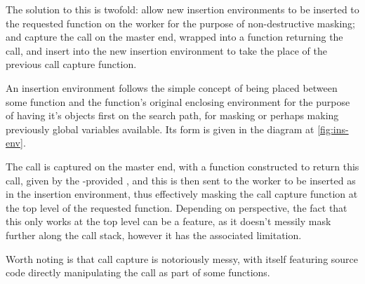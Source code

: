 The solution to this is twofold: allow new insertion environments to be inserted to the requested function on the worker for the purpose of non-destructive masking; and capture the call on the master end, wrapped into a function returning the call, and insert into the new insertion environment to take the place of the previous call capture function.

An insertion environment follows the simple concept of being placed between some function and the function's original enclosing environment for the purpose of having it's objects first on the search path, for masking or perhaps making previously global variables available.
Its form is given in the diagram at \cref{fig:ins-env}.



The call is captured on the master end, with a function constructed to return this call, given by the \lso{}-provided , and this is then sent to the worker to be inserted as  in the insertion environment, thus effectively masking the call capture function at the top level of the requested  function.
Depending on perspective, the fact that this only works at the top level can be a feature, as it doesn't messily mask further along the call stack, however it has the associated limitation.

Worth noting is that call capture is notoriously messy, with  itself featuring source code directly manipulating the call as part of some functions.


